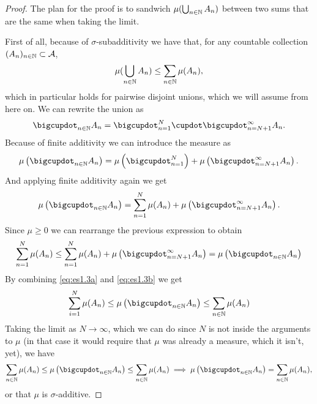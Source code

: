 \begin{proof}
	The plan for the proof is to sandwich $\mu(\bigcup_{n\in\mathbb{N}} A_n)$ between two sums that are the same when taking the limit.
		
	First of all, because of $\sigma$-subadditivity we have that, for any countable collection $(A_n)_{n\in\mathbb{N}} \subset \mathcal{A}$,
	\begin{align}
		\label{eq:es1.3a}
		\mu(\bigcup_{n\in\mathbb{N}} A_n) \leq \sum_{n\in \mathbb{N}} \mu(A_n),
	\end{align}
	which in particular holds for pairwise disjoint unions, which we will assume from here on. We can rewrite the union as
	\begin{align*}
		\bigcupdot_{n\in \N} A_n = \bigcupdot_{n = 1}^N \cupdot \bigcupdot_{n = N+1}^\infty A_n.
	\end{align*}
	Because of finite additivity we can introduce the measure as
	\begin{align*}
		\mu\left(\bigcupdot_{n\in \N} A_n\right) = \mu\left(\bigcupdot_{n = 1}^N\right) + \mu\left(\bigcupdot_{n = N+1}^\infty A_n\right).
	\end{align*}
	And applying finite additivity again we get
	\begin{align*}
		\mu\left(\bigcupdot_{n\in \N} A_n\right) = \sum_{n = 1}^N \mu(A_n) + \mu\left(\bigcupdot_{n = N+1}^\infty A_n\right).
	\end{align*}
	Since $\mu \geq 0$ we can rearrange the previous expression to obtain
	\begin{align}
		\label{eq:es1.3b}
		\sum_{n = 1}^N \mu(A_n) \leq \sum_{n = 1}^N \mu(A_n) + \mu\left(\bigcupdot_{n = N+1}^\infty A_n\right) = 	\mu\left(\bigcupdot_{n\in \N} A_n\right)
	\end{align}
	By combining \ref{eq:es1.3a} and \ref{eq:es1.3b} we get
	\begin{align*}
		\sum_{i = 1}^N \mu(A_n) \leq \mu\left(\bigcupdot_{n\in \N} A_n\right) \leq \sum_{n \in \N} \mu(A_n)
	\end{align*}
	Taking the limit as $N \to \infty$, which we can do since $N$ is not inside the arguments to $\mu$ (in that case it would require that $\mu$ was already a measure, which it isn't, yet), we have
	\begin{align*}
		\sum_{n \in \N} \mu(A_n) \leq \mu\left(\bigcupdot_{n\in \N} A_n\right) \leq \sum_{n \in \N} \mu(A_n) \implies \mu\left(\bigcupdot_{n\in \N} A_n\right) = \sum_{n \in \N} \mu(A_n),
	\end{align*}
	or that $\mu$ is $\sigma$-additive.
\end{proof}


